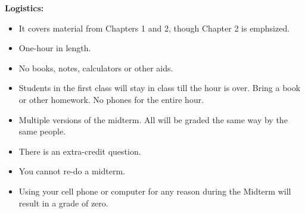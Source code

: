 \documentclass[12pt]{article}
\begin{document}
\textbf{Logistics:} 
\begin{itemize}
	\item It covers material from Chapters 1 and 2, though Chapter 2 is emphsized. 
	\item One-hour in length.
	\item No books, notes, calculators or other aids.
	\item Students in the first class will stay in class till the hour is over. Bring a book or other homework. No phones for the entire hour.
	\item Multiple versions of the midterm. All will be graded the same way by the same people.
	\item There is an extra-credit question.
	\item You cannot re-do a midterm.
	\item Using your cell phone or computer for any reason during the Midterm will result in a grade of zero.
	\end{itemize}
	
\vspace{.25in}
\end{document}
